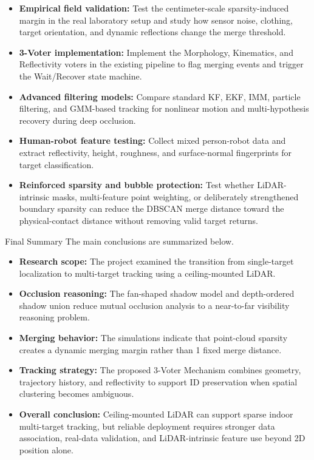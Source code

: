 \documentclass[11pt,a4paper]{report}
\begin{document}
\begin{contentbox}
\begin{itemize}[leftmargin=*]
    \item \textbf{Empirical field validation:} Test the centimeter-scale sparsity-induced margin in the real laboratory setup and study how sensor noise, clothing, target orientation, and dynamic reflections change the merge threshold.
    \item \textbf{3-Voter implementation:} Implement the Morphology, Kinematics, and Reflectivity voters in the existing pipeline to flag merging events and trigger the Wait/Recover state machine.
    \item \textbf{Advanced filtering models:} Compare standard KF, EKF, IMM, particle filtering, and GMM-based tracking for nonlinear motion and multi-hypothesis recovery during deep occlusion.
    \item \textbf{Human-robot feature testing:} Collect mixed person-robot data and extract reflectivity, height, roughness, and surface-normal fingerprints for target classification.
    \item \textbf{Reinforced sparsity and bubble protection:} Test whether LiDAR-intrinsic masks, multi-feature point weighting, or deliberately strengthened boundary sparsity can reduce the DBSCAN merge distance toward the physical-contact distance without removing valid target returns.
\end{itemize}
\end{contentbox}

\begin{sectionintro}{Final Summary}
The main conclusions are summarized below.
\end{sectionintro}

\begin{contentbox}
\begin{itemize}[leftmargin=*]
    \item \textbf{Research scope:} The project examined the transition from single-target localization to multi-target tracking using a ceiling-mounted LiDAR.
    \item \textbf{Occlusion reasoning:} The fan-shaped shadow model and depth-ordered shadow union reduce mutual occlusion analysis to a near-to-far visibility reasoning problem.
    \item \textbf{Merging behavior:} The simulations indicate that point-cloud sparsity creates a dynamic merging margin rather than 1 fixed merge distance.
    \item \textbf{Tracking strategy:} The proposed 3-Voter Mechanism combines geometry, trajectory history, and reflectivity to support ID preservation when spatial clustering becomes ambiguous.
    \item \textbf{Overall conclusion:} Ceiling-mounted LiDAR can support sparse indoor multi-target tracking, but reliable deployment requires stronger data association, real-data validation, and LiDAR-intrinsic feature use beyond 2D position alone.
\end{itemize}
\end{contentbox}
\end{document}

